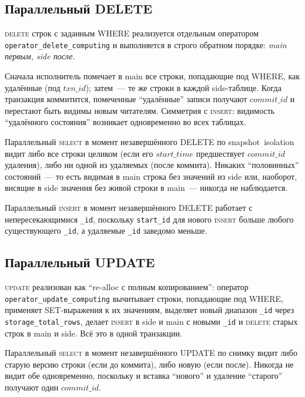 \subsection{Параллельный DELETE}

\textsc{delete} строк с заданным WHERE реализуется отдельным
оператором \texttt{operator\_delete\_computing} и выполняется в
строго обратном порядке: \emph{main первым, side после}.

Сначала исполнитель помечает в main все строки, попадающие под
WHERE, как удалённые (под $\mathit{txn\_id}$); затем~--- те же
строки в каждой side-таблице. Когда транзакция коммитится, помеченные
``удалённые'' записи получают $\mathit{commit\_id}$ и перестают быть
видимы новым читателям. Симметрия с \textsc{insert}: видимость
``удалённого состояния'' возникает одновременно во всех таблицах.

Параллельный \textsc{select} в момент незавершённого DELETE по
snapshot~isolation видит либо все строки целиком (если его
$\mathit{start\_time}$ предшествует $\mathit{commit\_id}$ удаления),
либо ни одной из удаляемых (после коммита). Никаких ``половинных''
состояний~--- то есть видимая в main строка без значений из side
или, наоборот, висящие в side значения без живой строки в main~---
никогда не наблюдается.

Параллельный \textsc{insert} в момент незавершённого DELETE
работает с непересекающимися \texttt{\_id}, поскольку
\texttt{start\_id} для нового \textsc{insert} больше любого
существующего \texttt{\_id}, а удаляемые \texttt{\_id}
заведомо меньше.

\subsection{Параллельный UPDATE}

\textsc{update} реализован как ``re-alloc с полным копированием'':
оператор \texttt{operator\_update\_computing} вычитывает строки,
попадающие под WHERE, применяет SET-выражения к их значениям,
выделяет новый диапазон \texttt{\_id} через
\texttt{storage\_total\_rows}, делает \textsc{insert} в side и main
с новыми \texttt{\_id} и \textsc{delete} старых строк в main и
side. Всё это в одной транзакции.

Параллельный \textsc{select} в момент незавершённого UPDATE по
снимку видит либо старую версию строки (если до коммита), либо
новую (если после). Никогда не видит обе одновременно, поскольку и
вставка ``нового'' и удаление ``старого'' получают один
$\mathit{commit\_id}$.

